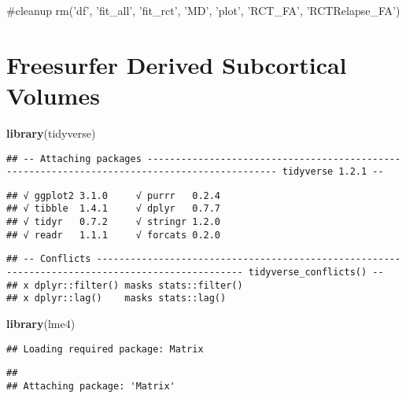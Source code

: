 \documentclass[]{article}
\newenvironment{Shaded}{\begin{snugshade}}{\end{snugshade}}
\newcommand{\KeywordTok}[1]{\textcolor[rgb]{0.13,0.29,0.53}{\textbf{#1}}}
\newcommand{\NormalTok}[1]{#1}
\theoremstyle{definition}
\theoremstyle{definition}
\theoremstyle{definition}
\theoremstyle{remark}
\begin{document}
\begin{Shaded}
\begin{Highlighting}[]
\NormalTok{#cleanup}
\NormalTok{rm('df', 'fit_all', 'fit_rct', 'MD', 'plot', 'RCT_FA', 'RCTRelapse_FA')}
\end{Highlighting}
\end{Shaded}

\section{Freesurfer Derived Subcortical
Volumes}\label{freesurfer-derived-subcortical-volumes}

\begin{Shaded}
\begin{Highlighting}[]
\KeywordTok{library}\NormalTok{(tidyverse)}
\end{Highlighting}
\end{Shaded}

\begin{verbatim}
## -- Attaching packages --------------------------------------------------------------------------------------------- tidyverse 1.2.1 --
\end{verbatim}

\begin{verbatim}
## √ ggplot2 3.1.0     √ purrr   0.2.4
## √ tibble  1.4.1     √ dplyr   0.7.7
## √ tidyr   0.7.2     √ stringr 1.2.0
## √ readr   1.1.1     √ forcats 0.2.0
\end{verbatim}

\begin{verbatim}
## -- Conflicts ------------------------------------------------------------------------------------------------ tidyverse_conflicts() --
## x dplyr::filter() masks stats::filter()
## x dplyr::lag()    masks stats::lag()
\end{verbatim}

\begin{Shaded}
\begin{Highlighting}[]
\KeywordTok{library}\NormalTok{(lme4)}
\end{Highlighting}
\end{Shaded}

\begin{verbatim}
## Loading required package: Matrix
\end{verbatim}

\begin{verbatim}
## 
## Attaching package: 'Matrix'
\end{verbatim}
\end{document}
